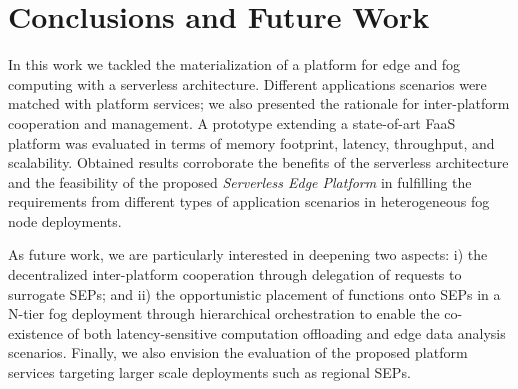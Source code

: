 \section{Conclusions and Future Work}\label{sec:conclusions}

In this work we tackled the materialization of a platform for edge and fog computing with a serverless architecture. Different applications scenarios were matched with platform services; we also presented the rationale for inter-platform cooperation and management. A prototype extending a state-of-art FaaS platform was evaluated in terms of memory footprint, latency, throughput, and scalability. Obtained results corroborate the benefits of the serverless architecture and the feasibility of the proposed \textit{Serverless Edge Platform} in fulfilling the requirements from different types of application scenarios in heterogeneous fog node deployments. 

As future work, we are particularly interested in deepening 
two aspects: i) the decentralized inter-platform cooperation through delegation of requests to surrogate SEPs; and ii) the opportunistic placement of functions onto SEPs in a N-tier fog deployment through hierarchical orchestration to enable the co-existence of both latency-sensitive computation offloading and edge data analysis scenarios. Finally, we also envision the evaluation of the proposed platform services targeting larger scale deployments such as regional SEPs.